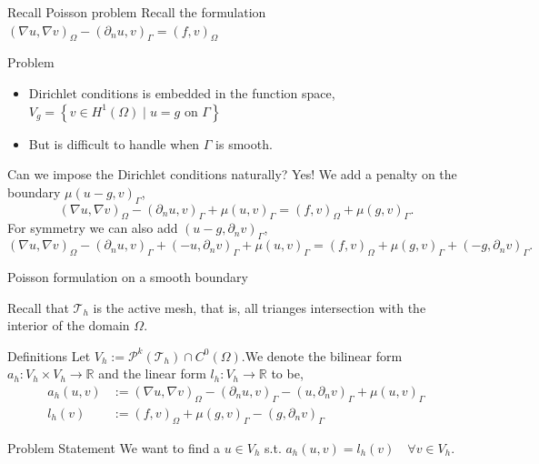 \begin{frame}{Recall Poisson problem }
        Recall the formulation \( ( \nabla u, \nabla v)_\Omega - ( \partial _{n} u, v)_{\Gamma } = ( f,v)_{\Omega }
        \)
        \begin{block}{Problem}
            \begin{itemize}
                \item
            Dirichlet conditions is embedded in the function space, \( V_{g} = \left\{ v \in H^{1 }( \Omega )   \mid  u = g \text{ on }  \Gamma   \right\} \)
        \item But is difficult to handle when $\Gamma $ is smooth.
            \end{itemize}
        \end{block}

        \begin{block}{Can we impose the Dirichlet conditions naturally?}
            Yes! We add a penalty on the boundary $ \mu (u-g,v )_{\Gamma }  $,
            \[
            ( \nabla u, \nabla v)_\Omega - ( \partial _{n} u, v)_{\Gamma }+ \mu (u,v )_{\Gamma } = ( f,v)_\Omega  + \mu (g,v )_{\Gamma }.
            \]
            For symmetry we can also add $(u-g , \partial _{n} v)_{\Gamma } $,\[
            ( \nabla u, \nabla v)_\Omega - ( \partial _{n} u, v)_{\Gamma } + (-u , \partial _{n} v)_{\Gamma }+ \mu (u,v )_{\Gamma } = ( f,v)_\Omega  + \mu (g,v )_{\Gamma }+ (-g , \partial _{n} v)_{\Gamma }.
            \]

        \end{block}
\end{frame}
\begin{frame}{Poisson formulation on a smooth boundary   }

    Recall that $\mathcal{T}_{h} $ is the active mesh, that is, all trianges intersection with the interior of the domain $\Omega$.
        \begin{block}{Definitions}
            Let $V_{h} := \mathcal{P}^{k}( \mathcal{T}_{h} )\cap C^{0}( \Omega )   $.We denote the bilinear form  $a_{h}:V_{h} \times V_{h} \to \mathbb{R} $ and the linear form  $l_{h}: V_{h} \to \mathbb{R} $ to be,\[
                \begin{split}
                a_{h}( u,v)&  :=  ( \nabla u, \nabla v)_\Omega - ( \partial _{n} u, v)_{\Gamma } - (u , \partial _{n} v)_{\Gamma }+ \mu (u,v )_{\Gamma }  \\
                l_{h} ( v) & :=( f,v)_\Omega  + \mu (g,v )_{\Gamma } - (g , \partial _{n} v)_{\Gamma }
                \end{split}
            \]

        \end{block}
        \begin{block}{Problem Statement}
            We want to find a $u \in V_{h} $ s.t. $a_{h}( u,v) = l_{h}( v)  \quad \forall v \in V_{h} $.
        \end{block}
\end{frame}


